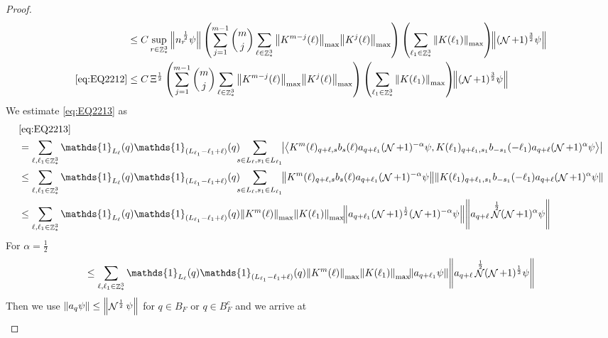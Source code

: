 \documentclass[sn-mathphys, Numbered ,a4paper]{sn-jnl}%
\DeclareMathOperator{\Z}{\mathbb{Z}}
\DeclareMathOperator{\NN}{\mathcal{N}}
\newcommand{\half}{\frac{1}{2}}
\newcommand{\eva}[1]{\left\langle #1 \right\rangle}
\theoremstyle{plain}
\theoremstyle{definition}
\theoremstyle{remark}
\theoremstyle{plain}
\theoremstyle{definition}
\theoremstyle{remark}
\begin{document}
\begin{proof}
\begin{align}
 	&\leq C \sup\limits_{r \in \Z^3_*} \norm{ n^{\,\half}_r \psi} \left(  \sum\limits_{j=1}^{m-1} {{m}\choose j} \sum\limits_{\ell \in \Z^3_*} \norm{K^{m-j}(\ell)}_{\mathrm{max}} \norm{ K^{j}(\ell)}_{\mathrm{max}} \right) \left( \sum\limits_{ \ell_1\in \Z^3_*} \norm{ K(\ell_1) }_{\mathrm{max} } \right)\!\! \norm{(\NN+1)^{\frac{3}{2}} \psi }\nonumber\\
 	\eqref{eq:EQ2212}&\leq C \, \Xi^\half \left(  \sum\limits_{j=1}^{m-1} {{m}\choose j} \sum\limits_{\ell \in \Z^3_*} \norm{K^{m-j}(\ell)}_{\mathrm{max}} \norm{ K^{j}(\ell)}_{\mathrm{max}}\right) \left( \sum\limits_{ \ell_1\in \Z^3_*}\norm{ K(\ell_1) }_{\mathrm{max}} \right)\!\! \norm{(\NN+1)^{\frac{3}{2}} \psi }\label{eq:estEQ2212}		
 \end{align}
 We estimate \eqref{eq:EQ2213} as
 \begin{align}
 	&\eqref{eq:EQ2213}\nonumber\\
 	&= \sum\limits_{\ell, \ell_1\in \Z^3_*} \mathds{1}_{L_{\ell}}(q) \mathds{1}_{(L_{\ell_1}-\ell_1+\ell)}(q) \!\!\! \sum\limits_{s \in L_{\ell},s_1\in L_{\ell_1}}\!\! \abs{\eva{ K^m(\ell)_{q+\ell,s}  b_{s}(\ell) a_{q+\ell_1} (\NN+1)^{-\alpha}\psi, K(\ell_1)_{q+\ell_1,s_1} b_{-s_1}(-\ell_1) a_{q+\ell} (\NN+1)^{\alpha} \psi }}\nonumber\\
 	&\leq\sum\limits_{\ell, \ell_1\in \Z^3_*} \mathds{1}_{L_{\ell}}(q) \mathds{1}_{(L_{\ell_1}-\ell_1+\ell)}(q) \!\!\! \sum\limits_{s \in L_{\ell},s_1\in L_{\ell_1}}\!\! \norm{ K^m(\ell)_{q+\ell,s} b_{s}(\ell) a_{q+\ell_1} (\NN+1)^{-\alpha}\psi}\norm{ K(\ell_1)_{q+\ell_1,s_1} b_{-s_1}(-\ell_1) a_{q+\ell} (\NN+1)^{\alpha} \psi }\nonumber\\
 	&\leq\sum\limits_{\ell, \ell_1\in \Z^3_*} \mathds{1}_{L_{\ell}}(q) \mathds{1}_{(L_{\ell_1}-\ell_1+\ell)}(q)\norm{K^m(\ell)}_{\mathrm{max}} \norm{ K(\ell_1)}_{\mathrm{max}} \! \norm{ a_{q+\ell_1} (\NN+1)^\half (\NN+1)^{-\alpha} \psi} \norm{ a_{q+\ell} \NN^\half (\NN+1)^{\alpha} \psi }\nonumber
 \end{align}
 For $\alpha=\half$
 \begin{equation}
 	\leq\sum\limits_{\ell, \ell_1\in \Z^3_*} \mathds{1}_{L_{\ell}}(q)  \mathds{1}_{(L_{\ell_1}-\ell_1+\ell)}(q)\norm{K^m(\ell)}_{\mathrm{max}} \norm{ K(\ell_1)}_{\mathrm{max}} \! \norm{ a_{q+\ell_1} \psi} \norm{ a_{q+\ell} \NN^\half (\NN+1)^\half \psi} \nonumber
 \end{equation} 
 Then we use $\norm{a_q\psi}\leq \norm{\NN^\half\psi}$ for $q \in B_F$ or $q \in B^c_F$ and we arrive at 
 \begin{align}

\end{align}
\end{proof}
\end{document}
